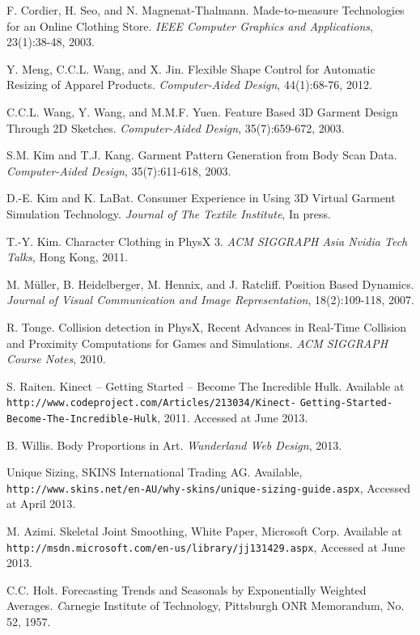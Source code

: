 \documentclass[number,preprint,review,12pt]{elsarticle}
\begin{document}
\begin{thebibliography}{}
F. Cordier, H. Seo, and N. Magnenat-Thalmann.
Made-to-measure Technologies for an Online Clothing Store. 
\textit{IEEE Computer Graphics and Applications}, 23(1):38-48, 2003. 

Y. Meng, C.C.L. Wang, and X. Jin.
Flexible Shape Control for Automatic Resizing of Apparel Products.
\textit{Computer-Aided Design}, 44(1):68-76, 2012. 
    
C.C.L. Wang, Y. Wang, and M.M.F. Yuen.
Feature Based 3D Garment Design Through 2D Sketches.
\textit{Computer-Aided Design}, 35(7):659-672, 2003. 

S.M. Kim and T.J. Kang.
Garment Pattern Generation from Body Scan Data.
\textit{Computer-Aided Design}, 35(7):611-618, 2003. 

D.-E. Kim  and K. LaBat. Consumer Experience in Using 3D Virtual Garment Simulation Technology. 
\textit{Journal of The Textile Institute}, In press.

T.-Y. Kim. Character Clothing in PhysX 3. \textit{ACM SIGGRAPH Asia Nvidia Tech Talks}, Hong Kong, 2011.

M. M\"{u}ller, B. Heidelberger, M. Hennix, and J. Ratcliff. Position Based Dynamics. \textit{Journal of Visual Communication and Image Representation}, 18(2):109-118, 2007.

R. Tonge. Collision detection in PhysX, Recent Advances in Real-Time Collision and Proximity Computations for
Games and Simulations. \textit{ACM SIGGRAPH Course Notes}, 2010.

S. Raiten. Kinect -- Getting Started -- Become The Incredible Hulk. Available at \verb+http://www.codeproject.com/Articles/213034/Kinect-+ \verb+Getting-Started-Become-The-Incredible-Hulk+, 2011. Accessed at June 2013.

B. Willis. Body Proportions in Art. \textit{Wunderland Web Design}, 2013.

Unique Sizing, SKINS International Trading AG. Available, \verb+http://www.skins.net/en-AU/why-skins/unique-sizing-guide.aspx+, Accessed at April 2013.

M. Azimi. Skeletal Joint Smoothing, White Paper, Microsoft Corp. Available at \verb+http://msdn.microsoft.com/en-us/library/jj131429.aspx+, Accessed at June 2013.

C.C. Holt. Forecasting Trends and Seasonals by Exponentially Weighted Averages. {\textit Carnegie Institute of Technology, Pittsburgh ONR Memorandum}, No. 52, 1957.


\end{thebibliography}
\end{document}
